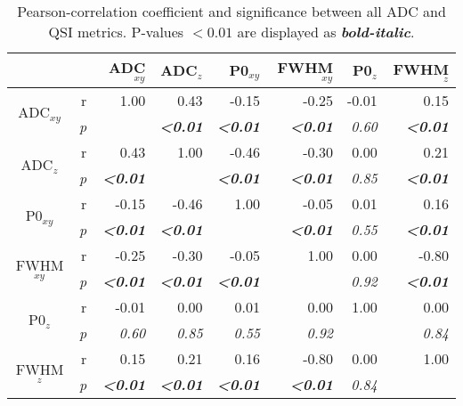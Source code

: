 \begin{table}
 \caption{Pearson-correlation coefficient and significance between all ADC and QSI metrics. P-values $<0.01$ are displayed as \textbf{\textit{bold-italic}}.}
 \begin{adjustbox}{width=0.8\textwidth,keepaspectratio}
 \begin{minipage}{\textwidth}
 \centering
    \begin{tabular}{rrrrrrrr}
    \addlinespace
    \toprule
              &       & ADC$_{xy}$  & ADC$_{z}$  & P0$_{xy}$   & FWHM$_{xy}$   & P0$_{z}$   & FWHM$_{z}$ \\
    \midrule
    \multicolumn{1}{c}{\multirow{2}[0]{*}{ADC$_{xy}$}} & r   & 1.00  & 0.43  & -0.15 & -0.25 & -0.01 & 0.15 \\
    \multicolumn{1}{c}{} & \textit{p} & \textit{} & \textbf{\textit{<0.01}} & \textbf{\textit{<0.01}} & \textbf{\textit{<0.01}} & \textit{0.60} & \textbf{\textit{<0.01}} \\
    \multicolumn{1}{c}{\multirow{2}[0]{*}{ADC$_{z}$}} & r   & 0.43  & 1.00  & -0.46 & -0.30 & 0.00  & 0.21 \\
    \multicolumn{1}{c}{} & \textit{p} & \textbf{\textit{<0.01}} & \textit{} & \textbf{\textit{<0.01}} & \textbf{\textit{<0.01}} & \textit{0.85} & \textbf{\textit{<0.01}} \\
    \multicolumn{1}{c}{\multirow{2}[0]{*}{P0$_{xy}$}} & r   & -0.15 & -0.46 & 1.00  & -0.05 & 0.01  & 0.16 \\
    \multicolumn{1}{c}{} & \textit{p} & \textbf{\textit{<0.01}} & \textbf{\textit{<0.01}} & \textit{} & \textbf{\textit{<0.01}} & \textit{0.55} & \textbf{\textit{<0.01}} \\
    \multicolumn{1}{c}{\multirow{2}[0]{*}{FWHM$_{xy}$}} & r   & -0.25 & -0.30 & -0.05 & 1.00  & 0.00  & -0.80 \\
    \multicolumn{1}{c}{} & \textit{p} & \textbf{\textit{<0.01}} & \textbf{\textit{<0.01}} & \textbf{\textit{<0.01}} & \textit{} & \textit{0.92} & \textbf{\textit{<0.01}} \\
    \multicolumn{1}{c}{\multirow{2}[0]{*}{P0$_{z}$}} & r   & -0.01 & 0.00  & 0.01  & 0.00  & 1.00  & 0.00 \\
    \multicolumn{1}{c}{} & \textit{p} & \textit{0.60} & \textit{0.85} & \textit{0.55} & \textit{0.92} & \textit{} & \textit{0.84} \\
    \multicolumn{1}{c}{\multirow{2}[0]{*}{FWHM$_{z}$}} & r   & 0.15  & 0.21  & 0.16  & -0.80 & 0.00  & 1.00 \\
    \multicolumn{1}{c}{} & \textit{p} & \textbf{\textit{<0.01}} & \textbf{\textit{<0.01}} & \textbf{\textit{<0.01}} & \textbf{\textit{<0.01}} & \textit{0.84} & \textit{} \\
    \bottomrule
    \end{tabular}%
  	\end{minipage}
	\end{adjustbox}
	\label{tab:chapter5 exp2 correlations}	
\end{table}
